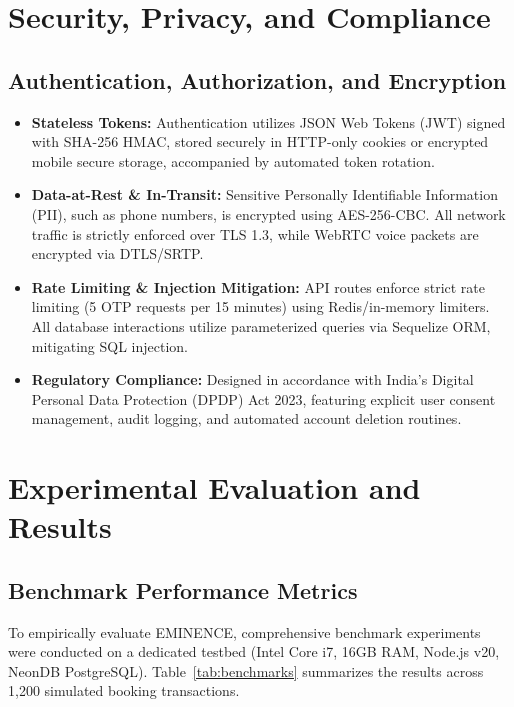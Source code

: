 \documentclass[conference]{IEEEtran}
\begin{document}
\section{Security, Privacy, and Compliance}
\subsection{Authentication, Authorization, and Encryption}
\begin{itemize}
    \item \textbf{Stateless Tokens:} Authentication utilizes JSON Web Tokens (JWT) signed with SHA-256 HMAC, stored securely in HTTP-only cookies or encrypted mobile secure storage, accompanied by automated token rotation.
    \item \textbf{Data-at-Rest \& In-Transit:} Sensitive Personally Identifiable Information (PII), such as phone numbers, is encrypted using AES-256-CBC. All network traffic is strictly enforced over TLS 1.3, while WebRTC voice packets are encrypted via DTLS/SRTP.
    \item \textbf{Rate Limiting \& Injection Mitigation:} API routes enforce strict rate limiting (5 OTP requests per 15 minutes) using Redis/in-memory limiters. All database interactions utilize parameterized queries via Sequelize ORM, mitigating SQL injection.
    \item \textbf{Regulatory Compliance:} Designed in accordance with India's Digital Personal Data Protection (DPDP) Act 2023, featuring explicit user consent management, audit logging, and automated account deletion routines.
\end{itemize}

\section{Experimental Evaluation and Results}

\subsection{Benchmark Performance Metrics}
To empirically evaluate EMINENCE, comprehensive benchmark experiments were conducted on a dedicated testbed (Intel Core i7, 16GB RAM, Node.js v20, NeonDB PostgreSQL). Table~\ref{tab:benchmarks} summarizes the results across 1,200 simulated booking transactions.
\end{document}
